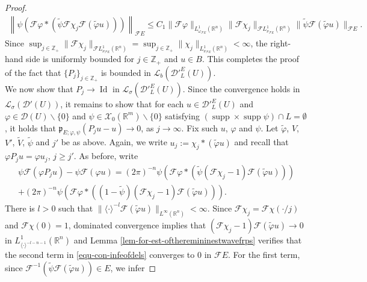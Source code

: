 \documentclass[12pt,reqno]{amsart}
\newcommand{\RR}{\mathbb R}
\newcommand{\ZZ}{\mathbb Z}
\newcommand{\DD}{\mathcal D}
\newcommand{\XX}{\mathcal X}
\newcommand{\supp}{\operatorname{supp}}
\theoremstyle{plain}
\theoremstyle{remark}
\theoremstyle{definition}
\numberwithin{equation}{section}
\begin{document}
\begin{proof}
\begin{align*}
\left\|\psi\left(\mathcal{F}\varphi*\left(\widetilde{\psi}\mathcal{F}\chi_j\mathcal{F}(\widetilde{\varphi}u)\right)\right)\right\|_{\mathcal{F}E} \leq C_1\|\mathcal{F}\varphi\|_{L^1_{\omega_{\mathcal{F}E}}(\RR^n)} \|\mathcal{F}\chi_j\|_{\mathcal{F}L^1_{\nu_{\mathcal{F}E}}(\RR^n)}\|\widetilde{\psi}\mathcal{F}(\widetilde{\varphi}u)\|_{\mathcal{F}E}.
\end{align*}
Since $\sup_{j\in\ZZ_+}\|\mathcal{F}\chi_j\|_{\mathcal{F}L^1_{\nu_{\mathcal{F}E}}(\RR^n)}=\sup_{j\in\ZZ_+}\|\chi_j\|_{L^1_{\nu_{\mathcal{F}E}}(\RR^n)} <\infty$, the right-hand side is uniformly bounded for $j\in\ZZ_+$ and $u\in B$. This completes the proof of the fact that $\{P_j\}_{j\in\ZZ_+}$ is bounded in $\mathcal{L}_b(\DD'^E_L(U))$.\\
\indent We now show that $P_j\rightarrow \operatorname{Id}$ in $\mathcal{L}_{\sigma}(\DD'^E_L(U))$. Since the convergence holds in $\mathcal{L}_{\sigma}(\DD'(U))$, it remains to show that for each $u\in\DD'^E_L(U)$ and $\varphi\in\DD(U)\backslash\{0\}$ and $\psi\in\XX_0(\RR^m)\backslash\{0\}$ satisfying $(\supp\times\supp\psi)\cap L=\emptyset$, it holds that $\mathfrak{p}_{E;\varphi,\psi}(P_ju-u)\rightarrow0$, as $j\rightarrow\infty$. Fix such $u$, $\varphi$ and $\psi$. Let $\widetilde{\varphi}$, $V$, $V'$, $\widetilde{V}$, $\widetilde{\psi}$ and $j'$ be as above. Again, we write $u_j:=\chi_j*(\widetilde{\varphi}u)$ and recall that $\varphi P_ju=\varphi u_j$, $j\geq j'$. As before, write
\begin{multline}\label{equ-con-infeofdels}
\psi\mathcal{F}(\varphi P_ju)-\psi\mathcal{F}(\varphi u) =(2\pi)^{-n}\psi\left(\mathcal{F}\varphi*\left(\widetilde{\psi}(\mathcal{F}\chi_j-1)\mathcal{F}(\widetilde{\varphi}u)\right)\right)\\
+(2\pi)^{-n}\psi\left(\mathcal{F}\varphi*\left((1-\widetilde{\psi})(\mathcal{F}\chi_j-1)\mathcal{F}(\widetilde{\varphi}u)\right)\right).
\end{multline}
There is $l>0$ such that $\|\langle\cdot\rangle^{-l}\mathcal{F}(\widetilde{\varphi}u)\|_{L^{\infty}(\RR^n)}<\infty$. Since $\mathcal{F}\chi_j=\mathcal{F}\chi(\cdot/j)$ and $\mathcal{F}\chi(0)=1$, dominated convergence implies that $(\mathcal{F}\chi_j-1)\mathcal{F}(\widetilde{\varphi}u)\rightarrow0$ in $L^1_{\langle\cdot\rangle^{-l-n-1}}(\RR^n)$ and Lemma \ref{lem-for-est-oftheremininestwavefrps} verifies that the second term in \eqref{equ-con-infeofdels} converges to $0$ in $\mathcal{F}E$. For the first term, since $\mathcal{F}^{-1}(\widetilde{\psi}\mathcal{F}(\widetilde{\varphi}u))\in E$, we infer

\end{proof}
\end{document}
